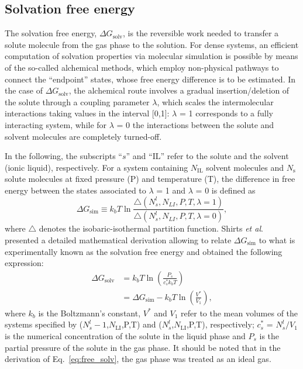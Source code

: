 \documentclass[3p,twocolumn]{elsarticle}
\begin{document}
\subsection*{Solvation free energy}
The solvation free energy, $\Delta G_{\text{solv}}$, is the reversible work needed to transfer a solute molecule from the gas phase to the solution. For dense systems, an efficient computation of solvation properties via molecular simulation is possible by means of the so-called alchemical methods, which employ non-physical pathways to connect the ``endpoint'' states, whose free energy difference is to be estimated. In the case of $\Delta G_{\text{solv}}$, the alchemical route involves a gradual insertion/deletion of the solute through a coupling parameter $\lambda$, which scales the intermolecular interactions taking values in the interval [0,1]: $\lambda$ = 1 corresponds to a fully interacting system, while for $\lambda$ = 0 the interactions between the solute and solvent molecules are completely turned-off.

In the following, the subscripts ``$s$'' and ``$\text{IL}$'' refer to the solute and the solvent (ionic liquid), respectively. For a system containing $N_{\text{IL}}$ solvent molecules and $N_{\text{s}}$ solute molecules at fixed pressure (P) and temperature (T), the difference in free energy between the states associated to $\lambda$ = 1 and $\lambda$ = 0 is defined as
\begin{equation}
\Delta G_{\text{sim}} \equiv k_b T \ln \frac{\bigtriangleup (N_s^l,N_{LI},P,T,\lambda = 1)}{\bigtriangleup (N_s^l,N_{LI},P,T,\lambda = 0)}, 
\end{equation}
where $\bigtriangleup$ denotes the isobaric-isothermal partition function. Shirts \textit{et al}. \cite{Shirts_2003} presented a detailed mathematical derivation allowing to relate $\Delta G_{\text{sim}}$ to what is experimentally known as the solvation free energy and obtained the following expression: 
\begin{equation}
\begin{split}
\label{eq:free_solv}
 \Delta G_{\text{solv}}& =  k_b T \ln \left( \frac{P_s}{c_s^{\ast} k_b T} \right)\\ &= \Delta G_{\text{sim}} - k_bT \ln \left( \frac{V^{\ast}}{V_1} \right) ,
\end{split}
\end{equation}
where $k_b$ is the Boltzmann's constant, $V^{\ast}$ and $V_1$ refer to the mean volumes of the systems specified by ($N_s^l-1$,$N_{\text{LI}}$,P,T) and ($N_s^l$,$N_{\text{LI}}$,P,T), respectively; $c_s^{\ast}$ = $N_s^l/V_1$ is the numerical concentration of the solute in the liquid phase and $P_s$ is the partial pressure of the solute in the gas phase. It should be noted that in the derivation of Eq.~\ref{eq:free_solv}, the gas phase was treated as an ideal gas. 
\end{document}
